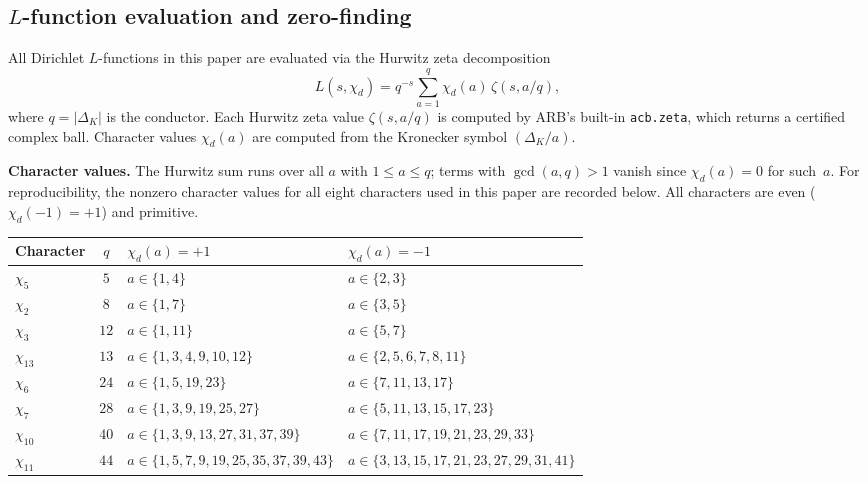 \documentclass[12pt,reqno]{amsart}
\theoremstyle{plain}
\theoremstyle{definition}
\theoremstyle{remark}
\begin{document}
\subsection{$L$-function evaluation and zero-finding}\label{subsec:Lfunc-method}

All Dirichlet $L$-functions in this paper are evaluated via the Hurwitz zeta decomposition
\[
  L(s, \chi_d) = q^{-s}\sum_{a=1}^{q} \chi_d(a)\,\zeta(s, a/q),
\]
where $q = |\Delta_K|$ is the conductor.  Each Hurwitz zeta value $\zeta(s, a/q)$ is computed by ARB's built-in \texttt{acb.zeta}, which returns a certified complex ball.  Character values $\chi_d(a)$ are computed from the Kronecker symbol $(\Delta_K/a)$.

\medskip\noindent\textbf{Character values.}  The Hurwitz sum runs over all $a$ with $1 \leq a \leq q$; terms with $\gcd(a,q) > 1$ vanish since $\chi_d(a) = 0$ for such~$a$.  For reproducibility, the nonzero character values for all eight characters used in this paper are recorded below.  All characters are even ($\chi_d(-1) = +1$) and primitive.

\begin{center}
\renewcommand{\arraystretch}{1.15}
\small
\begin{tabular}{lcll}
\toprule
Character & $q$ & $\chi_d(a) = +1$ & $\chi_d(a) = -1$ \\
\midrule
$\chi_5$    & $5$  & $a \in \{1,4\}$ & $a \in \{2,3\}$ \\
$\chi_2$    & $8$  & $a \in \{1,7\}$ & $a \in \{3,5\}$ \\
$\chi_3$    & $12$ & $a \in \{1,11\}$ & $a \in \{5,7\}$ \\
$\chi_{13}$ & $13$ & $a \in \{1,3,4,9,10,12\}$ & $a \in \{2,5,6,7,8,11\}$ \\
$\chi_6$    & $24$ & $a \in \{1,5,19,23\}$ & $a \in \{7,11,13,17\}$ \\
$\chi_7$    & $28$ & $a \in \{1,3,9,19,25,27\}$ & $a \in \{5,11,13,15,17,23\}$ \\
$\chi_{10}$ & $40$ & $a \in \{1,3,9,13,27,31,37,39\}$ & $a \in \{7,11,17,19,21,23,29,33\}$ \\
$\chi_{11}$ & $44$ & $a \in \{1,5,7,9,19,25,35,37,39,43\}$ & $a \in \{3,13,15,17,21,23,27,29,31,41\}$ \\
\bottomrule
\end{tabular}
\end{center}
\end{document}
